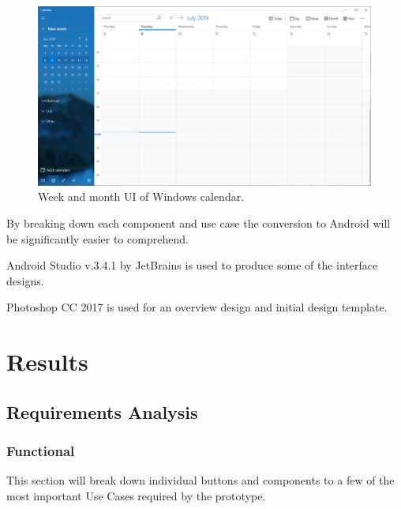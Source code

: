 \documentclass[]{article}
\begin{document}
\begin{flushleft}
\begin{figure}[H]
	\includegraphics[width=\linewidth, height=60mm]{weekview.png}
	\caption{Week and month UI of Windows calendar.}
	\label{fig:week_view}
\end{figure}

By breaking down each component and use case the conversion to Android will be significantly easier to comprehend.\medskip

Android Studio v.3.4.1 by JetBrains is used to produce some of the interface designs.

Photoshop CC 2017 is used for an overview design and initial design template.


\newpage
\section{Results}
\subsection{Requirements Analysis}


\subsubsection{Functional}
This section will break down individual buttons and components to a few of the most important Use Cases required by the prototype.\medskip

\begin{center}
\noindent{}\medskip




\end{center}
\end{flushleft}
\end{document}
